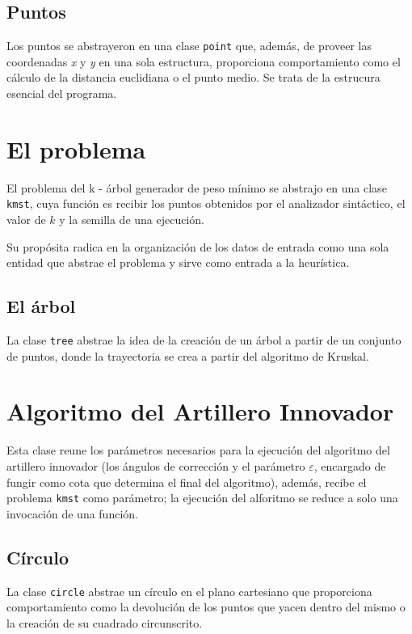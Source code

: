 \documentclass[a4paper]{report}
\begin{document}
  \subsection{Puntos}
  Los puntos se abstrayeron en una clase \texttt{point} que, adem\'as, de proveer las coordenadas
  \textit{x} y \textit{y} en una sola estructura, proporciona comportamiento como el c\'alculo
  de la distancia euclidiana o el punto medio. Se trata de la estrucura esencial del programa.

  \section{El problema}
  El problema del k - \'arbol generador de peso m\'inimo se abstrajo en una clase \texttt{kmst},
  cuya funci\'on es recibir los puntos obtenidos por el analizador sint\'actico, el valor de $k$
  y la semilla de una ejecuci\'on.

  Su prop\'osita radica en la organizaci\'on de los datos de entrada como una sola entidad que
  abstrae el problema y sirve como entrada a la heur\'istica.

  \subsection{El \'arbol}
  La clase \texttt{tree} abstrae la idea de la creaci\'on de un \'arbol a partir de un conjunto
  de puntos, donde la trayectoria se crea a partir del algoritmo de Kruskal.

  \section{Algoritmo del Artillero Innovador}
  Esta clase reune los par\'ametros necesarios para la ejecuci\'on del algoritmo del artillero
  innovador (los \'angulos de correcci\'on y el par\'ametro $\varepsilon$, encargado de fungir
  como cota que determina el final del algoritmo), adem\'as, recibe el problema \texttt{kmst}
  como par\'ametro; la ejecuci\'on del alforitmo se reduce a solo una invocaci\'on de una
  funci\'on.

  \subsection{Círculo}
  La clase \texttt{circle} abstrae un c\'irculo en el plano cartesiano que proporciona
  comportamiento como la devoluci\'on de los puntos que yacen dentro del mismo o
  la creaci\'on de su cuadrado circunscrito.
\end{document}
